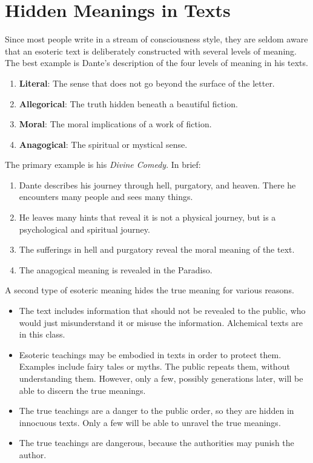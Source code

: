 \section{Hidden Meanings in Texts}

Since most people write in a stream of consciousness style, they are seldom aware that an esoteric text is deliberately constructed with several levels of meaning. The best example is Dante's description of the four levels of meaning in his texts.

\begin{enumerate}
\item \textbf{Literal}: The sense that does not go beyond the surface of the letter.
\item \textbf{Allegorical}: The truth hidden beneath a beautiful fiction.
\item \textbf{Moral}: The moral implications of a work of fiction.
\item \textbf{Anagogical}: The spiritual or mystical sense.
\end{enumerate}

The primary example is his \emph{Divine Comedy}. In brief:

\begin{enumerate}
\item Dante describes his journey through hell, purgatory, and heaven. There he encounters many people and sees many things.
\item He leaves many hints that reveal it is not a physical journey, but is a psychological and spiritual journey.
\item The sufferings in hell and purgatory reveal the moral meaning of the text.
\item The anagogical meaning is revealed in the Paradiso.
\end{enumerate}


A second type of esoteric meaning hides the true meaning for various reasons.

\begin{itemize}


\item The text includes information that should not be revealed to the public, who would just misunderstand it or misuse the information. Alchemical texts are in this class.

\item Esoteric teachings may be embodied in texts in order to protect them. Examples include fairy tales or myths. The public repeats them, without understanding them. However, only a few, possibly generations later, will be able to discern the true meanings.

\item The true teachings are a danger to the public order, so they are hidden in innocuous texts. Only a few will be able to unravel the true meanings.

\item The true teachings are dangerous, because the authorities may punish the author.
\end{itemize}


